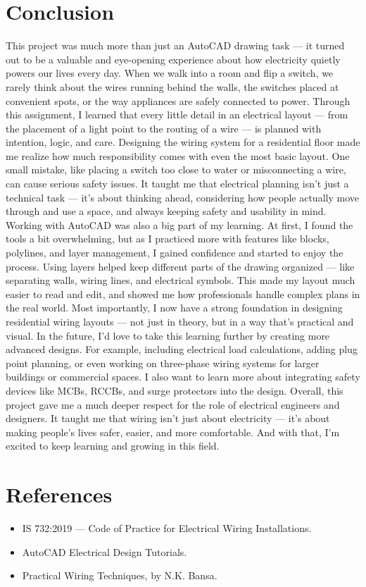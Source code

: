 \documentclass[12pt]{article}
\begin{document}
\section*{Conclusion}
This project was much more than just an AutoCAD drawing task — it turned out to be a valuable and eye-opening experience about how electricity quietly powers our lives every day. When we walk into a room and flip a switch, we rarely think about the wires running behind the walls, the switches placed at convenient spots, or the way appliances are safely connected to power. Through this assignment, I learned that every little detail in an electrical layout — from the placement of a light point to the routing of a wire — is planned with intention, logic, and care.
Designing the wiring system for a residential floor made me realize how much responsibility comes with even the most basic layout. One small mistake, like placing a switch too close to water or misconnecting a wire, can cause serious safety issues. It taught me that electrical planning isn't just a technical task — it's about thinking ahead, considering how people actually move through and use a space, and always keeping safety and usability in mind.
Working with AutoCAD was also a big part of my learning. At first, I found the tools a bit overwhelming, but as I practiced more with features like blocks, polylines, and layer management, I gained confidence and started to enjoy the process. Using layers helped keep different parts of the drawing organized — like separating walls, wiring lines, and electrical symbols. This made my layout much easier to read and edit, and showed me how professionals handle complex plans in the real world.
Most importantly, I now have a strong foundation in designing residential wiring layouts — not just in theory, but in a way that’s practical and visual. In the future, I’d love to take this learning further by creating more advanced designs. For example, including electrical load calculations, adding plug point planning, or even working on three-phase wiring systems for larger buildings or commercial spaces. I also want to learn more about integrating safety devices like MCBs, RCCBs, and surge protectors into the design.
Overall, this project gave me a much deeper respect for the role of electrical engineers and designers. It taught me that wiring isn’t just about electricity — it’s about making people’s lives safer, easier, and more comfortable. And with that, I’m excited to keep learning and growing in this field.


\section*{References}
\begin{itemize}
    \item IS 732:2019 — Code of Practice for Electrical Wiring Installations.
    \item AutoCAD Electrical Design Tutorials.
    \item Practical Wiring Techniques, by N.K. Bansa.
\end{itemize}
\end{document}
